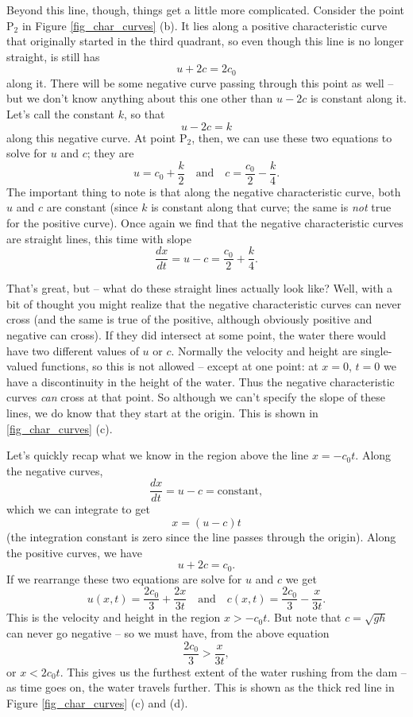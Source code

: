 Beyond this line, though, things get a little more complicated.  Consider the point P$_2$ in Figure \ref{fig_char_curves} (b).  It lies along a positive characteristic curve that originally started in the third quadrant, so even though this line is no longer straight, is still has
\[
u + 2c = 2c_0
\]
along it.  There will be some negative curve passing through this point as well -- but we don't know anything about this one other than $u-2c$ is constant along it.  Let's call the constant $k$, so that
\[
u - 2c = k
\]
along this negative curve.  At point P$_2$, then, we can use these two equations to solve for $u$ and $c$; they are
\[
u = c_0 + \frac{k}{2} \quad \text{and} \quad c = \frac{c_0}{2} - \frac{k}{4}.
\]
The important thing to note is that along the negative characteristic curve, both $u$ and $c$ are constant (since $k$ is constant along that curve; the same is \emph{not} true for the positive curve).  Once again we find that the negative characteristic curves are straight lines, this time with slope
\[
\frac{dx}{dt} = u - c = \frac{c_0}{2} + \frac{k}{4}.
\]

That's great, but -- what do these straight lines actually look like?  Well, with a bit of thought you might realize that the negative characteristic curves can never cross (and the same is true of the positive, although obviously positive and negative can cross).  If they did intersect at some point, the water there would have two different values of $u$ or $c$.  Normally the velocity and height are single-valued functions, so this is not allowed -- except at one point: at $x = 0$, $t=0$ we have a discontinuity in the height of the water.  Thus the negative characteristic curves \emph{can} cross at that point.  So although we can't specify the slope of these lines, we do know that they start at the origin.  This is shown in \ref{fig_char_curves} (c). 

Let's quickly recap what we know in the region above the line $x = -c_0 t$.  Along the negative curves, 
\[
\frac{dx}{dt} = u - c = \text{constant},
\]
which we can integrate to get
\[
x = (u-c) t
\]
(the integration constant is zero since the line passes through the origin).
Along the positive curves, we have 
\[
u + 2c = c_0.
\]
If we rearrange these two equations are solve for $u$ and $c$ we get
\begin{equation}
\label{eq_dam_dist}
u(x, t) = \frac{2c_0}{3} + \frac{2x}{3t} \quad \text{and} \quad c(x, t) = \frac{2c_0}{3} - \frac{x}{3t}.
\end{equation}
This is the velocity and height in the region $x>-c_0 t$.  But note that $c = \sqrt{gh}$ can never go negative -- so we must have, from the above equation
\[
\frac{2c_0}{3} > \frac{x}{3t},
\]
or $x < 2c_0 t$.  This gives us the furthest extent of the water rushing from the dam -- as time goes on, the water travels further.  This is shown as the thick red line in Figure \ref{fig_char_curves} (c) and (d).

